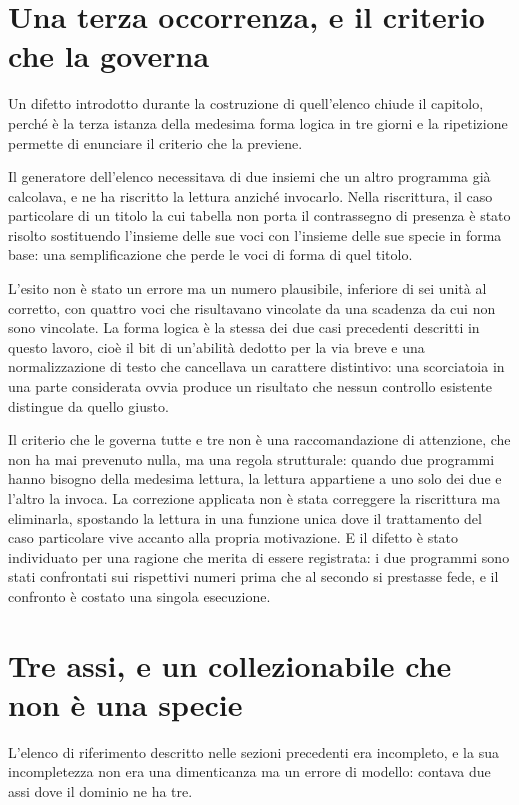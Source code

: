 \section{Una terza occorrenza, e il criterio che la governa}

Un difetto introdotto durante la costruzione di quell'elenco chiude il capitolo, perché è la terza istanza della medesima forma logica in tre giorni e la ripetizione permette di enunciare il criterio che la previene.

Il generatore dell'elenco necessitava di due insiemi che un altro programma già calcolava, e ne ha riscritto la lettura anziché invocarlo. Nella riscrittura, il caso particolare di un titolo la cui tabella non porta il contrassegno di presenza è stato risolto sostituendo l'insieme delle sue voci con l'insieme delle sue specie in forma base: una semplificazione che perde le voci di forma di quel titolo.

L'esito non è stato un errore ma un numero plausibile, inferiore di sei unità al corretto, con quattro voci che risultavano vincolate da una scadenza da cui non sono vincolate. La forma logica è la stessa dei due casi precedenti descritti in questo lavoro, cioè il bit di un'abilità dedotto per la via breve e una normalizzazione di testo che cancellava un carattere distintivo: una scorciatoia in una parte considerata ovvia produce un risultato che nessun controllo esistente distingue da quello giusto.

Il criterio che le governa tutte e tre non è una raccomandazione di attenzione, che non ha mai prevenuto nulla, ma una regola strutturale: quando due programmi hanno bisogno della medesima lettura, la lettura appartiene a uno solo dei due e l'altro la invoca. La correzione applicata non è stata correggere la riscrittura ma eliminarla, spostando la lettura in una funzione unica dove il trattamento del caso particolare vive accanto alla propria motivazione. E il difetto è stato individuato per una ragione che merita di essere registrata: i due programmi sono stati confrontati sui rispettivi numeri prima che al secondo si prestasse fede, e il confronto è costato una singola esecuzione.
\section{Tre assi, e un collezionabile che non è una specie}

L'elenco di riferimento descritto nelle sezioni precedenti era incompleto, e la sua incompletezza non era una dimenticanza ma un errore di modello: contava due assi dove il dominio ne ha tre.

